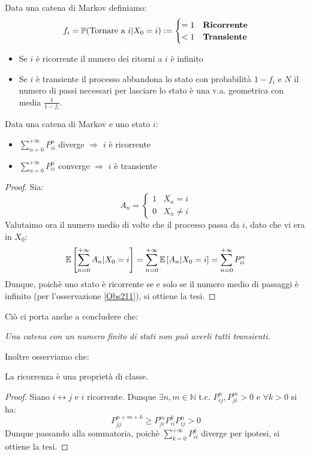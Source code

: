 \begin{definition}
Data una catena di Markov definiamo: \[f_i=\mathbb{P}(\text{Tornare a }i | X_0=i):= \begin{cases}
=1 & \text{\textbf{Ricorrente}}
\\ <1 &\text{\textbf{Transiente}}
\end{cases}\]
\end{definition}
\begin{observation} \label{Obs211}
\begin{itemize}
    \item Se $i$ è ricorrente il numero dei ritorni a $i$ è infinito
    \item Se $i$ è transiente il processo abbandona lo stato con probabilità $1-f_i$ e $N$ il numero di passi necessari per lasciare lo stato è una v.a. geometrica con media $\frac{1}{1-f_i}$.
\end{itemize}
\end{observation}
\begin{theorem} \label{Tras_Ric}
Data una catena di Markov e uno stato $i$:
\begin{itemize}
    \item $\sum_{n=0}^{+\infty}P_{ii}^n$ diverge $\Rightarrow$ $i$ è ricorrente
    \item $\sum_{n=0}^{+\infty}P_{ii}^n$ converge $\Rightarrow$ $i$ è transiente
\end{itemize}
\begin{proof}
Sia: \[A_n= \begin{cases}
1 & X_n=i
\\ 0 & X_n\neq i
\end{cases}\]
Valutaimo ora il numero medio di volte che il processo passa da $i$, dato che vi era in $X_0$:
\[\mathbb{E}\left[\sum_{n=0}^{+\infty}A_n | X_0=i\right]=\sum_{n=0}^{+\infty}\mathbb{E}\left[A_n|X_0=i\right]=\sum_{n=0}^{+\infty}P_{ii}^n\]
Dunque, poichè uno stato è ricorrente se e solo se il numero medio di passaggi è infinito (per l'osservazione \ref{Obs211}), si ottiene la tesi.
\end{proof}
\end{theorem}
Ciò ci porta anche a concludere che:
\begin{center}
    \textit{Una catena con un numero finito di stati non può averli tutti transienti.}
\end{center}
Inoltre osserviamo che:
\begin{proposition}
La ricorrenza è una proprietà di classe.
\begin{proof}
Siano $i\longleftrightarrow j$ e $i$ ricorrente. Dunque $\exists n,m\in\mathbb{N}$ t.c. $P_{ij}^n,P_{ji}^m>0$ e $\forall k>0$ si ha:
\[P^{n+m+k}_{jj}\geq P^m_{ji}P^k_{ii}P^n_{ij}>0\]
Dunque passando alla sommatoria, poichè $\sum_{k=0}^{+\infty}P_{ii}^k$ diverge per ipotesi, si ottiene la tesi.
\end{proof}
\end{proposition}

